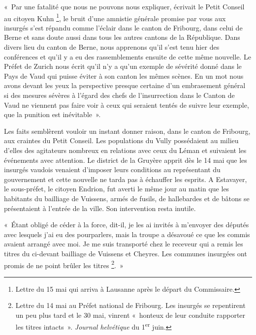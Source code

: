 \documentclass[french,twoside]{book} %
\newenvironment{quoteblock}%
  {\begin{quoting}}
  {\end{quoting}}
\newenvironment{quotebar}{%
    \def\FrameCommand{{\color{rubric!10!}\vrule width 0.5em} \hspace{0.9em}}%
    \def\OuterFrameSep{\itemsep} %
    \MakeFramed {\advance\hsize-\width \FrameRestore}
  }%
  {%
    \endMakeFramed
  }
\renewenvironment{quoteblock}%
  {%
    \savenotes
    \setstretch{0.9}
    \normalfont
    \begin{quotebar}
  }
  {%
    \end{quotebar}
    \spewnotes
  }
\begin{document}
\begin{quoteblock}
 \noindent « Par une fatalité que nous ne pouvons nous expliquer, écrivait le Petit Conseil au citoyen Kuhn \footnote{Lettre du 15 mai qui arriva à Lausanne après le départ du Commissaire.}, le bruit d’une amnistie générale promise par vous aux insurgés s’est répandu comme l’éclair dans le canton de Fribourg, dans celui de Berne et sans doute aussi dans tous les autres cantons de la République. Dans divers lieu du canton de Berne, nous apprenons qu’il s’est tenu hier des conférences et qu’il y a eu des rassemblements ensuite de cette même nouvelle. Le Préfet de Zurich nous écrit qu’il n’y a qu’un exemple de sévérité donné dans le Pays de Vaud qui puisse éviter à son canton les mêmes scènes. En un mot nous avons devant les yeux la perspective presque certaine d’un embrasement général si des mesures sévères à l’égard des chefs de l’insurrection dans le Canton de Vaud ne viennent pas faire voir à ceux qui seraient tentés de suivre leur exemple, que la punition est inévitable ».
 \end{quoteblock}

\noindent Les faits semblèrent vouloir un instant donner raison, dans le canton de Fribourg, aux craintes du Petit Conseil. Les populations du Vully possédaient au milieu d’elles des agitateurs nombreux en relations avec ceux du Léman et suivaient les événements avec attention. Le district de la Gruyère apprit dès le 14 mai que les insurgés vaudois venaient d’imposer leurs conditions au représentant du gouvernement et cette nouvelle ne tarda pas à échauffer les esprits. A Estavayer, le sous-préfet, le citoyen Endrion, fut averti le même jour au matin que les habitants du bailliage de Vuissens, armés de fusils, de hallebardes et de bâtons se présentaient à l’entrée de la ville. Son intervention resta inutile.\par

\begin{quoteblock}
 \noindent « Étant obligé de céder à la force, dit-il, je les ai invités à m’envoyer des députés avec lesquels j’ai eu des pourparlers, mais la troupe a désavoué ce que les commis avaient arrangé avec moi. Je me suis transporté chez le receveur qui a remis les titres du ci-devant bailliage de Vuissens et Cheyres. Les communes insurgées ont promis de ne point brûler les titres \footnote{Lettre du 14 mai au Préfet national de Fribourg. Les insurgés se repentirent un peu plus tard et le 30 mai, vinrent « honteux de leur conduite rapporter les titres intacts ». \emph{Journal helvétique} du 1\textsuperscript{er} juin.}. »
 \end{quoteblock}
\end{document}
